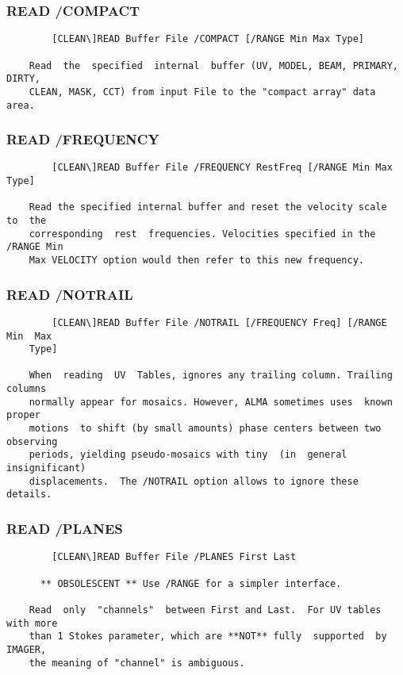 \subsubsection{READ /COMPACT}
\begin{verbatim}
        [CLEAN\]READ Buffer File /COMPACT [/RANGE Min Max Type]

    Read  the  specified  internal  buffer (UV, MODEL, BEAM, PRIMARY, DIRTY,
    CLEAN, MASK, CCT) from input File to the "compact array" data area.

\end{verbatim}
\subsubsection{READ /FREQUENCY}
\begin{verbatim}
        [CLEAN\]READ Buffer File /FREQUENCY RestFreq [/RANGE Min Max Type]

    Read the specified internal buffer and reset the velocity scale  to  the
    corresponding  rest  frequencies. Velocities specified in the /RANGE Min
    Max VELOCITY option would then refer to this new frequency.

\end{verbatim}
\subsubsection{READ /NOTRAIL}
\begin{verbatim}
        [CLEAN\]READ Buffer File /NOTRAIL [/FREQUENCY Freq] [/RANGE Min  Max
    Type]

    When  reading  UV  Tables, ignores any trailing column. Trailing columns
    normally appear for mosaics. However, ALMA sometimes uses  known  proper
    motions  to shift (by small amounts) phase centers between two observing
    periods, yielding pseudo-mosaics with tiny  (in  general  insignificant)
    displacements.  The /NOTRAIL option allows to ignore these details.

\end{verbatim}
\subsubsection{READ /PLANES}
\begin{verbatim}
        [CLEAN\]READ Buffer File /PLANES First Last

      ** OBSOLESCENT ** Use /RANGE for a simpler interface.

    Read  only  "channels"  between First and Last.  For UV tables with more
    than 1 Stokes parameter, which are **NOT** fully  supported  by  IMAGER,
    the meaning of "channel" is ambiguous.

\end{verbatim}
